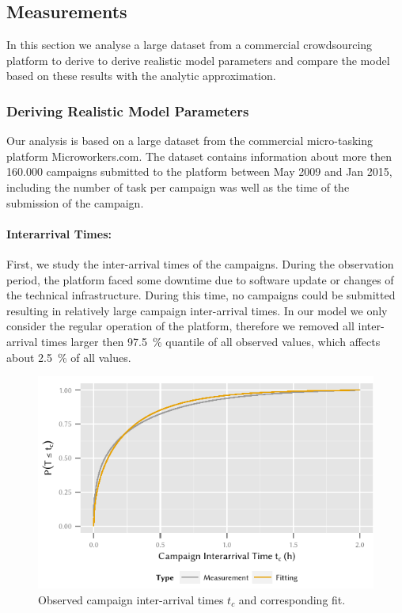\subsection{Measurements}\label{sec:cloud:crowdsourcing:measurements}
In this section we analyse a large dataset from a commercial crowdsourcing platform to derive to derive realistic model parameters and compare the model based on these results with the analytic approximation.

\subsubsection*{Deriving Realistic Model Parameters}
Our analysis is based on a large dataset from the commercial micro-tasking platform Microworkers.com.
The dataset contains information about more then 160.000 campaigns submitted to the platform between May 2009 and Jan 2015, including the number of task per campaign was well as the time of the submission of the campaign.  

\paragraph*{Interarrival Times:} First, we study the inter-arrival times of the campaigns.
During the observation period, the platform faced some downtime due to software update or changes of the technical infrastructure.
During this time, no campaigns could be submitted resulting in relatively large campaign inter-arrival times.
In our model we only consider the regular operation of the platform, therefore we removed all inter-arrival times larger then \SI{97.5}{\percent} quantile of all observed values, which affects about \SI{2.5}{\percent} of all values.

\begin{figure}
  \centering
  \includegraphics{cloud/crowdsourcing/measurements/figures/campaign_interarrival}
  \caption{Observed campaign inter-arrival times \(t_c\) and corresponding fit.}
  \label{fig:cloud:crowdsourcing:measurements:parameters:campaign_interarrival}
\end{figure}

